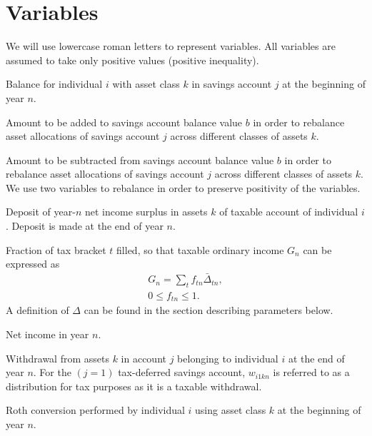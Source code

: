 \documentclass{article}[fleqn,12pt]
\begin{document}
\section{Variables}
We will use lowercase roman letters to represent variables. All variables are assumed
to take only positive values (positive inequality).
\begin{description}[leftmargin=4em,style=multiline]
\item [$b_{ijkn}$]
	Balance for individual $i$ with asset class $k$ in savings account $j$ at the beginning of year $n$.
\item [$b^+_{ijkn}$]
	Amount to be added to savings account balance value $b$ in order to rebalance asset allocations of
	savings account $j$ across different classes of assets $k$.
\item [$b^-_{ijkn}$]
	Amount to be subtracted from savings account balance value $b$ in order to rebalance asset allocations of
	savings account $j$ across different classes of assets $k$. We use two variables
	to rebalance in order to preserve positivity of the variables.
\item [$d_{ikn}$]
	Deposit of year-$n$ net income surplus in assets $k$ of taxable account of individual $i$.
	Deposit is made at the end of year $n$.
\item [$f_{t n}$]
	Fraction of tax bracket $t$ filled, so that taxable ordinary income $G_n$ can be expressed as
	\begin{eqnarray}
		\label{Eq:Tx1}
		G_n = \sum_t f_{t n}\bar{\Delta}_{t n},\\
		0 \leq f_{t n} \leq 1.
	\end{eqnarray}
	A definition of $\Delta$ can be found in the section describing parameters below. 
\item [$g_n$]
	Net income in year $n$.
\item [$w_{ijkn}$]
	Withdrawal from assets $k$ in account $j$ belonging to individual $i$ at the end of year $n$.
	For the $(j=1)$ tax-deferred savings account, $w_{i1kn}$ is referred to as a distribution for
	tax purposes as it is a taxable withdrawal.
\item [$x_{ikn}$]
	Roth conversion performed by individual $i$ using asset class $k$ at the beginning of year $n$.
\end{description}
\end{document}
